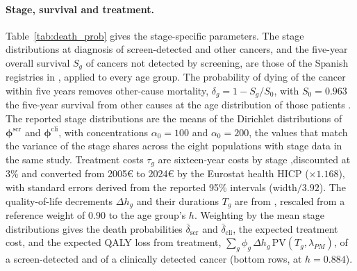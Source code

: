 \documentclass[12pt]{article}
\begin{document}
\paragraph{Stage, survival and treatment.} Table~\ref{tab:death_prob} gives the stage-specific parameters. The stage distributions at diagnosis of screen-detected and other cancers, and the five-year overall survival $S_g$ of cancers not detected by screening, are those of the Spanish registries in \citet{cardoso2022overall}, applied to every age group. The probability of dying of the cancer within five years removes other-cause mortality, $\delta_g = 1 - S_g/S_0$, with $S_0 = 0.963$ the five-year survival from other causes at the age distribution of those patients \citep{ine2024mortalidad}. The reported stage distributions are the means of the Dirichlet distributions of $\boldsymbol{\phi}^{\text{scr}}$ and $\boldsymbol{\phi}^{\text{cli}}$, with concentrations $\alpha_0 = 100$ and $\alpha_0 = 200$, the values that match the variance of the stage shares across the eight populations with stage data in the same study. Treatment costs $\tau_g$ are sixteen-year costs by stage \citep{corral2015estimation},discounted at 3\% and converted from 2005€ to 2024€ by the Eurostat health HICP ($\times 1.168$), with standard errors derived from the reported 95\% intervals (width$/3.92$). The quality-of-life decrements $\Delta h_g$ and their durations $T_g$ are from \citet{djalalov2014review}, rescaled from a reference weight of $0.90$ to the age group's $h$. Weighting by the mean stage distributions gives the death probabilities $\bar\delta_{\text{scr}}$ and $\bar\delta_{\text{cli}}$, the expected treatment cost, and the expected QALY loss from treatment, $\sum_g \phi_g\, \Delta h_g\, \mathrm{PV}(T_g, \lambda_{PM})$, of a screen-detected and of a clinically detected cancer (bottom rows, at $h = 0.884$).
\end{document}
